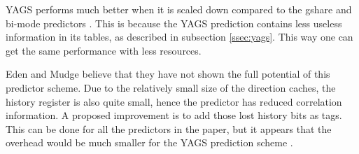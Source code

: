 YAGS performs much better when it is scaled down compared to the gshare and bi-mode predictors \cite{yags}.
This is because the YAGS prediction contains less useless information in its tables, as described in subsection \ref{ssec:yags}.
This way one can get the same performance with less resources.

Eden and Mudge believe that they have not shown the full potential of this predictor scheme.
Due to the relatively small size of the direction caches, the history register is also quite small, hence the predictor has reduced correlation information.
A proposed improvement is to add those lost history bits as tags.
This can be done for all the predictors in the paper, but it appears that the overhead would be much smaller for the YAGS prediction scheme \cite{yags}. 
